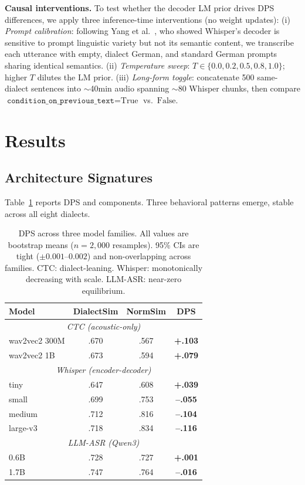 \documentclass[11pt,a4paper]{article}
\begin{document}
\textbf{Causal interventions.} To test whether the decoder LM prior drives DPS differences, we apply three inference-time interventions (no weight updates): (i) \textit{Prompt calibration}: following Yang et al.~, who showed Whisper's decoder is sensitive to prompt linguistic variety but not its semantic content, we transcribe each utterance with empty, dialect German, and standard German prompts sharing identical semantics. (ii) \textit{Temperature sweep}: $T \in \{0.0, 0.2, 0.5, 0.8, 1.0\}$; higher $T$ dilutes the LM prior. (iii) \textit{Long-form toggle}: concatenate 500 same-dialect sentences into $\sim$40min audio spanning $\sim$80 Whisper chunks, then compare $\texttt{condition\_on\_previous\_text}=\text{True}$ vs.\ $\text{False}$.

\section{Results}

\subsection{Architecture Signatures}

Table~\ref{tab:arch} reports DPS and components. Three behavioral patterns emerge, stable across all eight dialects.

\begin{table}[t]
\centering\small
\setlength{\tabcolsep}{4pt}
\begin{tabular}{lccc}
\toprule
\textbf{Model} & \textbf{DialectSim} & \textbf{NormSim} & \textbf{DPS} \\
\midrule
\multicolumn{4}{c}{\textit{CTC (acoustic-only)}} \\
wav2vec2 300M & .670 & .567 & \textbf{+.103} \\
wav2vec2 1B   & .673 & .594 & \textbf{+.079} \\
\midrule
\multicolumn{4}{c}{\textit{Whisper (encoder-decoder)}} \\
tiny   & .647 & .608 & \textbf{+.039} \\
small  & .699 & .753 & \textbf{--.055} \\
medium & .712 & .816 & \textbf{--.104} \\
large-v3 & .718 & .834 & \textbf{--.116} \\
\midrule
\multicolumn{4}{c}{\textit{LLM-ASR (Qwen3)}} \\
0.6B & .728 & .727 & \textbf{+.001} \\
1.7B & .747 & .764 & \textbf{--.016} \\
\bottomrule
\end{tabular}
\caption{DPS across three model families. All values are bootstrap means ($n=2{,}000$ resamples). 95\% CIs are tight ($\pm 0.001$--$0.002$) and non-overlapping across families. CTC: dialect-leaning. Whisper: monotonically decreasing with scale. LLM-ASR: near-zero equilibrium.}
\label{tab:arch}
\end{table}
\end{document}
